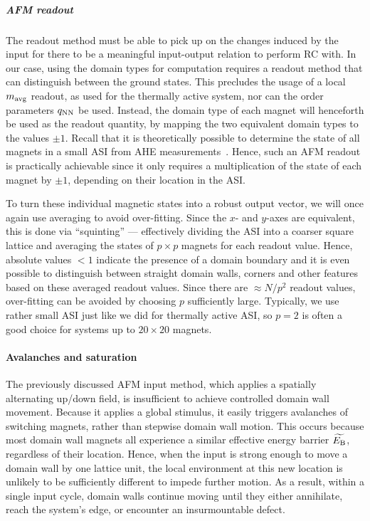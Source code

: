 \subparagraph{AFM readout}
The readout method must be able to pick up on the changes induced by the input for there to be a meaningful input-output relation to perform RC with.
In our case, using the domain types for computation requires a readout method that can distinguish between the ground states.
This precludes the usage of a local $m_\mathrm{avg}$ readout, as used for the thermally active system, nor can the order parameters $q_\mathrm{NN}$ be used.
Instead, the domain type of each magnet will henceforth be used as the readout quantity, by mapping the two equivalent domain types to the values $\pm 1$.
Recall that it is theoretically possible to determine the state of all magnets in a small ASI from AHE measurements~\cite[Supp. 7]{KUR-24}.
Hence, such an AFM readout is practically achievable since it only requires a multiplication of the state of each magnet by $\pm 1$, depending on their location in the ASI. \par
To turn these individual magnetic states into a robust output vector, we will once again use averaging to avoid over-fitting.
Since the $x$- and $y$-axes are equivalent, this is done via ``squinting'' --- effectively dividing the ASI into a coarser square lattice and averaging the states of $p \times p$ magnets for each readout value.
Hence, absolute values $<1$ indicate the presence of a domain boundary and it is even possible to distinguish between straight domain walls, corners and other features based on these averaged readout values.
Since there are $\approx N/p^2$ readout values, over-fitting can be avoided by choosing $p$ sufficiently large.
Typically, we use rather small ASI just like we did for thermally active ASI, so $p=2$ is often a good choice for systems up to $20 \times 20$ magnets.

\paragraph{Avalanches and saturation}
The previously discussed AFM input method, which applies a spatially alternating up/down field, is insufficient to achieve controlled domain wall movement.
Because it applies a global stimulus, it easily triggers avalanches of switching magnets, rather than stepwise domain wall motion.
This occurs because most domain wall magnets all experience a similar effective energy barrier $\widetilde{E_\mathrm{B}}$, regardless of their location.
Hence, when the input is strong enough to move a domain wall by one lattice unit, the local environment at this new location is unlikely to be sufficiently different to impede further motion.
As a result, within a single input cycle, domain walls continue moving until they either annihilate, reach the system's edge, or encounter an insurmountable defect. \par

